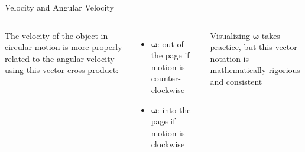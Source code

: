 \documentclass[12pt,compress,aspectratio=169]{beamer}
\newcommand{\mb}[1]{\ensuremath\mathbf{#1}}
\newcommand{\eq}[2]{\vspace{#1}{\Large\begin{displaymath}#2\end{displaymath}}}
\begin{document}
\begin{frame}{Velocity and Angular Velocity}
  \begin{columns}

    The velocity of the object in circular motion is more properly related to
    the angular velocity using this vector cross product:

    \eq{-.25in}{
      \mb{v}=\bm{\omega}\times\mb{r}
    }

    \begin{itemize}
    \item\vspace{-.2in}$\bm{\omega}$: out of the page if motion is
      counter-clockwise
    \item $\bm{\omega}$: into the page if motion is clockwise
    \end{itemize}
    Visualizing $\bm{\omega}$ takes practice, but this vector notation is
    mathematically rigorious and consistent
  \end{columns}
\end{frame}
\end{document}
